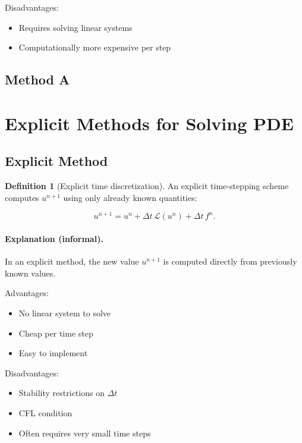 \documentclass[11pt,a4paper,parskip=half-]{scrartcl}
\theoremstyle{definition}
\newtheorem{definition}{Definition}[section]
\theoremstyle{plain}
\theoremstyle{remark}
\begin{document}
Disadvantages:

\begin{itemize}
  \item Requires solving linear systems
  \item Computationally more expensive per step
\end{itemize}

\subsection{Method A}

\section{Explicit Methods for Solving PDE}
\subsection{Explicit Method}

\begin{definition}[Explicit time discretization]

  An explicit time-stepping scheme computes $u^{n+1}$
  using only already known quantities:

  \[
    u^{n+1}
    =
    u^n
    +
    \Delta t \, \mathcal{L}(u^n)
    +
    \Delta t \, f^n.
  \]

\end{definition}
\paragraph{Explanation (informal).}

In an explicit method,
the new value $u^{n+1}$ is computed directly
from previously known values.

Advantages:

\begin{itemize}
  \item No linear system to solve
  \item Cheap per time step
  \item Easy to implement
\end{itemize}

Disadvantages:

\begin{itemize}
  \item Stability restrictions on $\Delta t$
  \item CFL condition
  \item Often requires very small time steps
\end{itemize}
\end{document}
